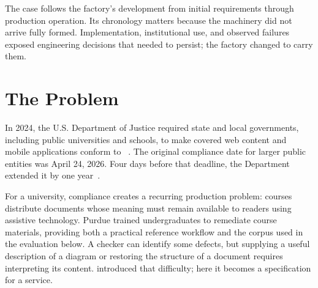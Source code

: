 
The case follows the factory's development from initial requirements through production operation. Its chronology matters because the machinery did not arrive fully formed. Implementation, institutional use, and observed failures exposed engineering decisions that needed to persist; the factory changed to carry them.

\section{The Problem}\label{heading:nearly-free}



In 2024, the U.S. Department of Justice required state and local governments, including public universities and schools, to make covered web content and mobile applications conform to ~\citep{doj-web-accessibility-2024}. The original compliance date for larger public entities was April 24, 2026. Four days before that deadline, the Department extended it by one year~\citep{doj2026extension}.


For a university, compliance creates a recurring production problem: courses distribute documents whose meaning must remain available to readers using assistive technology. Purdue trained undergraduates to remediate course materials, providing both a practical reference workflow and the corpus used in the evaluation below. A checker can identify some defects, but supplying a useful description of a diagram or restoring the structure of a document requires interpreting its content.  introduced that difficulty; here it becomes a specification for a service.

